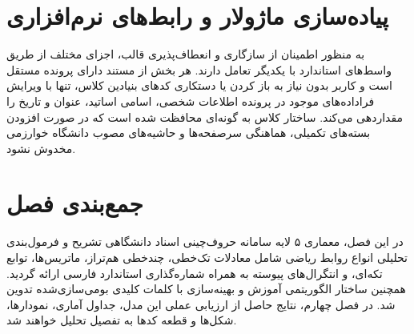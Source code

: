 \section{پیاده‌سازی ماژولار و رابط‌های نرم‌افزاری}
\label{sec:ch3_interfaces}

به منظور اطمینان از سازگاری و انعطاف‌پذیری قالب، اجزای مختلف از طریق واسط‌های استاندارد با یکدیگر تعامل دارند. هر بخش از مستند دارای پرونده مستقل است و کاربر بدون نیاز به باز کردن یا دستکاری کدهای بنیادین کلاس، تنها با ویرایش فراداده‌های موجود در پرونده  اطلاعات شخصی، اسامی اساتید، عنوان و تاریخ را مقداردهی می‌کند. ساختار کلاس به گونه‌ای محافظت شده است که در صورت افزودن بسته‌های تکمیلی، هماهنگی سرصفحه‌ها و حاشیه‌های مصوب دانشگاه خوارزمی مخدوش نشود.

\section{جمع‌بندی فصل}
\label{sec:ch3_summary}

در این فصل، معماری ۵ لایه سامانه حروف‌چینی اسناد دانشگاهی تشریح و فرمول‌بندی تحلیلی انواع روابط ریاضی شامل معادلات تک‌خطی، چندخطی هم‌تراز، ماتریس‌ها، توابع تکه‌ای، و انتگرال‌های پیوسته به همراه شماره‌گذاری استاندارد فارسی ارائه گردید. همچنین ساختار الگوریتمی آموزش و بهینه‌سازی با کلمات کلیدی بومی‌سازی‌شده تدوین شد. در فصل چهارم، نتایج حاصل از ارزیابی عملی این مدل، جداول آماری، نمودارها، شکل‌ها و قطعه کدها به تفصیل تحلیل خواهند شد.
